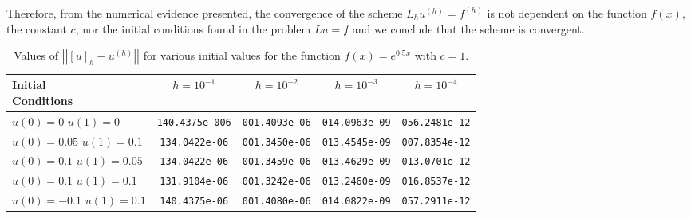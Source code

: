Therefore, from the numerical evidence presented, the convergence of the
scheme $L_h u^{(h)} = f^{(h)}$ is not dependent on the function $f(x)$, the constant
$c$, nor the initial conditions found in the problem $Lu =f$ and we conclude that
the scheme is convergent.

\begin{table}[H]
  \centering
  \bgroup
  \def\arraystretch{1.5}
  \begin{tabular}{| l | c | c | c | c |}
    \hline
    \shortstack[l]{Initial \\ Conditions} & $h = 10^{-1}$ & $h = 10^{-2}$ & $h = 10^{-3}$ & $h = 10^{-4}$ \\
    \hline
    \shortstack[l]{$u(0) = 0$ \\ $u(1) = 0$} & \texttt{140.4375e-006} &   \texttt{001.4093e-06} & \texttt{014.0963e-09}  &  \texttt{056.2481e-12} \\
    \hline
    \shortstack[l]{$u(0) = 0.05$ \\ $u(1) = 0.1$} & \texttt{134.0422e-06} &  \texttt{001.3450e-06} &    \texttt{013.4545e-09} &   \texttt{007.8354e-12} \\
    \hline
    \shortstack[l]{$u(0) = 0.1$ \\ $u(1) = 0.05$} & \texttt{134.0422e-06} &  \texttt{001.3459e-06} &    \texttt{013.4629e-09} &   \texttt{013.0701e-12} \\
    \hline
    \shortstack[l]{$u(0) = 0.1$ \\ $u(1) = 0.1$} & \texttt{131.9104e-06} &  \texttt{001.3242e-06} &    \texttt{013.2460e-09} &   \texttt{016.8537e-12} \\
    \hline
    \shortstack[l]{$u(0) = -0.1$ \\ $u(1) = 0.1$} & \texttt{140.4375e-06} &  \texttt{001.4080e-06} &    \texttt{014.0822e-09} &   \texttt{057.2911e-12} \\
    \hline
  \end{tabular}
  \egroup
  \caption{Values of $\left|\left|[u]_h - u^{(h)}\right|\right|$ for various initial values
     for the function $f(x) = e^{0.5x}$ with $c=1$.}\label{tab:con}
\end{table}
